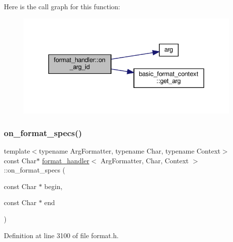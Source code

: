 Here is the call graph for this function\+:
\nopagebreak
\begin{figure}[H]
\begin{center}
\leavevmode
\includegraphics[width=324pt]{structformat__handler_a5030233b6e1cb1824e131712a3ec5156_cgraph}
\end{center}
\end{figure}
\mbox{\label{structformat__handler_a4d16ddae0958acb12d0606038c393b24}} 
\subsubsection{\texorpdfstring{on\+\_\+format\+\_\+specs()}{on\_format\_specs()}}
{\footnotesize\ttfamily template$<$typename Arg\+Formatter, typename Char, typename Context$>$ \\
const Char$\ast$ \hyperlink{structformat__handler}{format\+\_\+handler}$<$ Arg\+Formatter, Char, Context $>$\+::on\+\_\+format\+\_\+specs (\begin{DoxyParamCaption}\item[{const Char $\ast$}]{begin,  }\item[{const Char $\ast$}]{end }\end{DoxyParamCaption})\hspace{0.3cm}{\ttfamily [inline]}}



Definition at line 3100 of file format.\+h.

